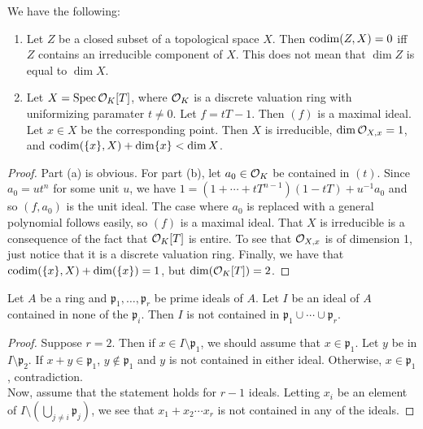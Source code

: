 \begin{exer}
	We have the following:
	\begin{enumerate}[label=(\alph*)]
		\item Let $Z$ be a closed subset of a topological space $X$.
			Then $\operatorname{codim}(Z,X) = 0$ iff $Z$ contains an irreducible
			component of $X$. This does not mean that $\dim Z$ is
			equal to $\dim X$.
		\item Let $X = \operatorname{Spec} \mathcal{O}_K[T]$, where $\mathcal{O}_K$ is a discrete
			valuation ring with uniformizing paramater $t \neq 0$.
			Let $f = tT - 1$. Then $(f)$ is a maximal ideal. Let
			$x \in X$ be the corresponding point. Then $X$ is
			irreducible, $\dim \mathcal{O}_{X,x} = 1$, and $\operatorname{codim}(\{x\},X)
			+ \dim \{x\} < \dim X$.
	\end{enumerate}
\end{exer}
\begin{proof}
	Part (a) is obvious. For part (b), let $a_0 \in \mathcal{O}_K$ be contained in
	$(t)$. Since $a_0 = ut^n$ for some unit $u$, we have
	$1 = (1 + \cdots + tT^{n-1})(1-tT) + u^{-1}a_0$ and so $(f, a_0)$ is the
	unit ideal. The case where $a_0$ is replaced with a general polynomial
	follows easily, so $(f)$ is a maximal ideal. That $X$ is irreducible is
	a consequence of the fact that $\mathcal{O}_K[T]$ is entire. To see that
	$\mathcal{O}_{X,x}$ is of dimension 1, just notice that it is a discrete
	valuation ring. Finally, we have that $\operatorname{codim}(\{x\},X) + \dim(\{x\}) =
	1$, but $\dim(\mathcal{O}_K[T]) = 2$.
\end{proof}

\begin{exer}
	Let $A$ be a ring and $\mathfrak p_1,\ldots,\mathfrak p_r$ be prime
	ideals of $A$. Let $I$ be an ideal of $A$ contained in none of the
	$\mathfrak p_i$. Then $I$ is not contained in $\mathfrak p_1 \cup \cdots
	\cup \mathfrak p_r$.
\end{exer}
\begin{proof}
	Suppose $r = 2$. Then if $x \in I \setminus \mathfrak p_1$, we should
	assume that $x \in \mathfrak p_1$. Let $y$ be in $I \setminus \mathfrak
	p_2$. If $x + y \in \mathfrak p_1$, $y \not\in \mathfrak p_1$ and $y$
	is not contained in either ideal. Otherwise, $x \in \mathfrak p_1$,
	contradiction.\\

	Now, assume that the statement holds for $r-1$ ideals. Letting $x_i$ be
	an element of $I \setminus (\bigcup_{j \neq i} \mathfrak p_j)$, we see
	that $x_1 + x_2 \cdots x_r$ is not contained in any of the ideals.
\end{proof}

